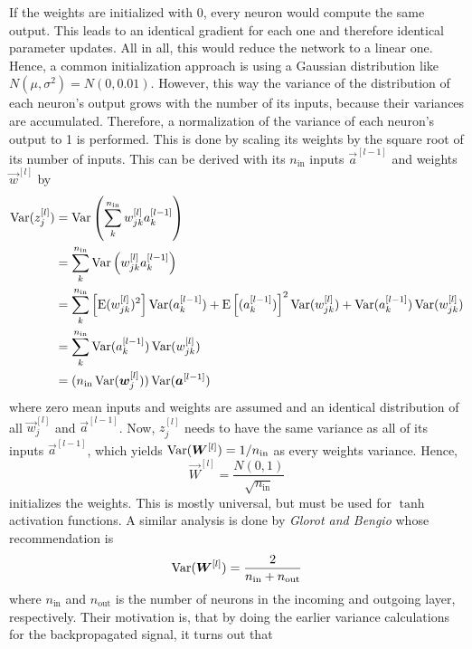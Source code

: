 If the weights are initialized with 0, every neuron would compute the same output.
This leads to an identical gradient for each one and therefore identical parameter updates.
All in all, this would reduce the network to a linear one.
Hence, a common initialization approach is using a Gaussian distribution like $N(\mu, \sigma^2) = N(0, 0.01)$.
However, this way the variance of the distribution of each neuron's output grows with the number of its inputs, because their variances are accumulated.
Therefore, a normalization of the variance of each neuron's output to 1 is performed.
This is done by scaling its weights by the square root of its number of inputs.
This can be derived with its $n_{\text{in}}$ inputs $\vec{a}^{[l-1]}$ and weights $\vec{w}^{[l]}$ by
\begin{align*}
	\operatorname{\mathrm{Var}}(z^{[l]}_{j}) &= \operatorname{\mathrm{Var}} \left( \sum_{k}^{n_{\text{in}}} w^{[l]}_{jk} a^{[l-1]}_k \right) \\
	&= \sum_{k}^{n_{\text{in}}} \operatorname{\mathrm{Var}} \left( w^{[l]}_{jk} a^{[l-1]}_k \right) \\
	&= \sum_{k}^{n_{\text{in}}} \left[ \operatorname{\mathrm{E}}(w^{[l]}_{jk})^2 \right] \operatorname{\mathrm{Var}}(a^{[l-1]}_k) + \operatorname{\mathrm{E}} \left[ (a^{[l-1]}_k) \right]^2 \operatorname{\mathrm{Var}}(w^{[l]}_{jk}) + \operatorname{\mathrm{Var}}(a^{[l-1]}_k) \operatorname{\mathrm{Var}}(w^{[l]}_{jk}) \\
	&= \sum_{k}^{n_{\text{in}}} \operatorname{\mathrm{Var}}(a^{[l-1]}_k) \operatorname{\mathrm{Var}}(w^{[l]}_{jk}) \\
	&= (n_{\text{in}} \operatorname{\mathrm{Var}}(\bm{w}^{[l]}_j)) \operatorname{\mathrm{Var}}(\bm{a}^{[l-1]}) \\
\end{align*}
where zero mean inputs and weights are assumed and an identical distribution of all $\vec{w}^{[l]}_{j}$ and $\vec{a}^{[l-1]}$.
Now, $z_j^{[l]}$ needs to have the same variance as all of its inputs $\vec{a}^{[l-1]}$, which yields $\operatorname{\mathrm{Var}}(\bm{W}^{[l]}) = 1/n_{\text{in}}$ as every weights variance.
Hence,
\begin{equation}
	\vec{W}^{[l]} = \frac{N(0,1)}{\sqrt{n_{\text{in}}}}
\end{equation}
initializes the weights.
This is mostly universal, but must be used for $\tanh$ activation functions.
A similar analysis is done by \textit{Glorot and Bengio} \cite{Glorot10understandingthe} whose recommendation is
\begin{equation*}
	\operatorname{\mathrm{Var}}(\bm{W}^{[l]}) = \frac{2}{n_{\text{in}} + n_{\text{out}}}
\end{equation*}
where $n_{\text{in}}$ and $n_{\text{out}}$ is the number of neurons in the incoming and outgoing layer, respectively.
Their motivation is, that by doing the earlier variance calculations for the backpropagated signal, it turns out that
